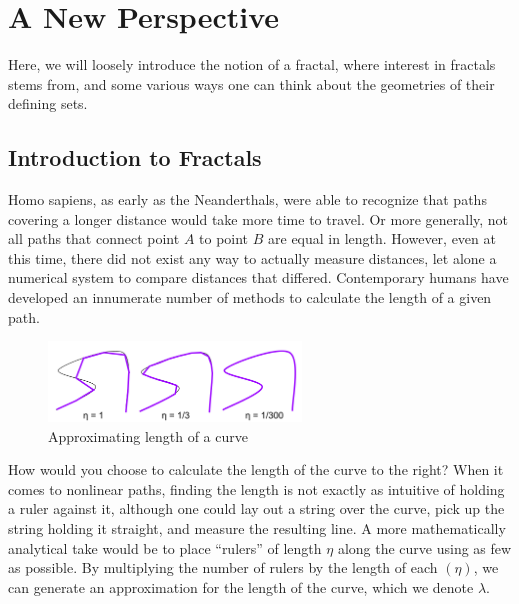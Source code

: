 \chapter{A New Perspective}

\begin{summary}
  Here, we will loosely introduce the notion of a fractal, where interest in fractals stems from, and some various ways one can think about the geometries of their defining sets. 
\end{summary}

\section{Introduction to Fractals}
Homo sapiens, as early as the Neanderthals, were able to recognize that paths covering a longer distance would take more time to travel. Or more generally, not all paths that connect point $A$ to point $B$ are equal in length. However, even at this time, there did not exist any way to actually measure distances, let alone a numerical system to compare distances that differed. Contemporary humans have developed an innumerate number of methods to calculate the length of a given path. \\

\begin{figure}
  \begin{center}
    \includegraphics[width=0.6\textwidth]{Images/1.1.png}
  \end{center}
  \caption{Approximating length of a curve}
\end{figure}

How would you choose to calculate the length of the curve to the right? When it comes to nonlinear paths, finding the length is not exactly as intuitive of holding a ruler against it, although one could lay out a string over the curve, pick up the string holding it straight, and measure the resulting line. A more mathematically analytical take would be to place ``rulers'' of length $\eta$ along the curve using as few as possible. By multiplying the number of rulers by the length of each $(\eta)$, we can generate an approximation for the length of the curve, which we denote $\lambda$. \\


